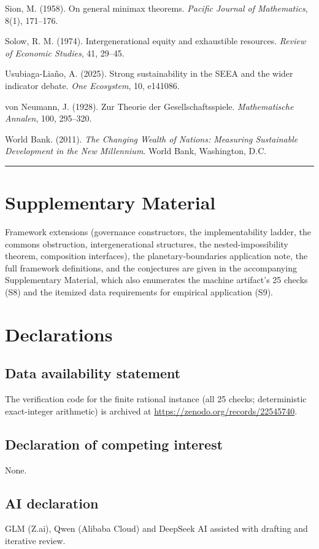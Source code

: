 \documentclass[review,11pt]{elsarticle}
\begin{document}
Sion, M. (1958). On general minimax theorems. \emph{Pacific Journal of
Mathematics}, 8(1), 171--176.

Solow, R. M. (1974). Intergenerational equity and exhaustible resources.
\emph{Review of Economic Studies}, 41, 29--45.

Usubiaga-Lia\~no, A. (2025). Strong sustainability in the SEEA and the
wider indicator debate. \emph{One Ecosystem}, 10, e141086.

von Neumann, J. (1928). Zur Theorie der Gesellschaftsspiele.
\emph{Mathematische Annalen}, 100, 295--320.

World Bank. (2011). \emph{The Changing Wealth of Nations: Measuring
Sustainable Development in the New Millennium}. World Bank, Washington,
D.C.

\begin{center}\rule{0.5\linewidth}{0.5pt}\end{center}

\section*{Supplementary Material}\label{supplementary-material}

Framework extensions (governance constructors, the implementability ladder, the commons obstruction, intergenerational structures, the nested-impossibility theorem, composition interfaces), the planetary-boundaries application note, the full framework definitions, and the conjectures are given in the accompanying Supplementary Material, which also enumerates the machine artifact's 25 checks (S8) and the itemized data requirements for empirical application (S9).

\section*{Declarations}

\subsection*{Data availability statement}

The verification code for the finite rational instance (all 25 checks; deterministic exact-integer arithmetic) is archived at \url{https://zenodo.org/records/22545740}.

\subsection*{Declaration of competing interest}

None.

\subsection*{AI declaration}
GLM (Z.ai), Qwen (Alibaba Cloud) and DeepSeek AI assisted with drafting and iterative review.
\end{document}

